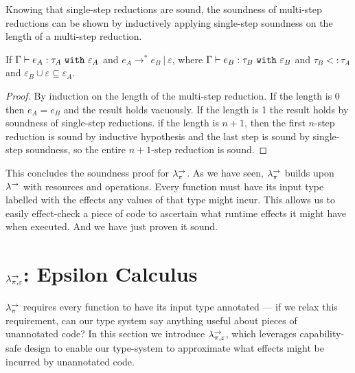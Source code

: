 Knowing that single-step reductions are sound, the soundness of multi-step reductions can be shown by inductively applying single-step soundness on the length of a multi-step reduction.

\begin{theorem}
If $ \Gamma \vdash  e_A:  \tau_A~\mathtt{with}~ \varepsilon_A$ and $e_A \longrightarrow^{*} e_B~|~\varepsilon$, where $\Gamma \vdash e_B: \tau_B~\mathtt{with}~ \varepsilon_B$ and $ \tau_B <: \tau_A$ and $\varepsilon_B \cup \varepsilon \subseteq \varepsilon_A$.
\end{theorem}

\begin{proof} By induction on the length of the multi-step reduction. If the length is 0 then $e_A = e_B$ and the result holds vacuously. If the length is 1 the result holds by soundness of single-step reductions. if the length is $n+1$, then the first $n$-step reduction is sound by inductive hypothesis and the last step is sound by single-step soundness, so the entire $n+1$-step reduction is sound.
\end{proof}

This concludes the soundness proof for $\lambda^{\rightarrow}_{\pi}$. As we have seen, $\lambda^{\rightarrow}_{\pi}$ builds upon $\lambda^{\rightarrow}$ with resources and operations. Every function must have its input type labelled with the effects any values of that type might incur. This allows us to easily effect-check a piece of code to ascertain what runtime effects it might have when executed. And we have just proven it sound.
























\section{$\lambda^{\rightarrow}_{\pi, \varepsilon}$: Epsilon Calculus}

$\lambda^{\rightarrow}_{\pi}$ requires every function to have its input type annotated --- if we relax this requirement, can our type system say anything useful about pieces of unannotated code? In this section we introduce $\lambda^{\rightarrow}_{\pi, \varepsilon}$, which leverages capability-safe design to enable our type-system to approximate what effects might be incurred by unannotated code.

